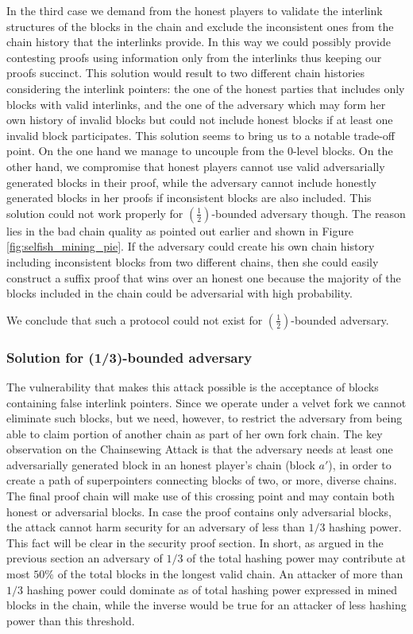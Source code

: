 In the third case we demand from the honest players to validate the interlink structures of the blocks in the chain and exclude the inconsistent ones from the chain history that the interlinks provide. In this way we could possibly provide contesting proofs using information only from the interlinks thus keeping our proofs succinct. This solution would result to two different chain histories considering the interlink pointers: the one of the honest parties that includes only blocks with valid interlinks, and the one of the adversary which may form her own history of invalid blocks but could not include honest blocks if at least one invalid block participates. This solution seems to bring us to a notable trade-off point. On the one hand we manage to uncouple from the 0-level blocks. On the other hand, we compromise that honest players cannot use valid adversarially generated blocks in their proof, while the adversary cannot include honestly generated blocks in her proofs if inconsistent blocks are also included. This solution could not work properly for $(\frac{1}{2})$-bounded adversary though. The reason lies in the bad chain quality as pointed out earlier and shown in Figure \ref{fig:selfish_mining_pie}. If the adversary  could create his own chain history including inconsistent blocks from two different chains, then she could easily construct a suffix proof that wins over an honest one because the majority of the blocks included in the chain could be adversarial with high probability. 

We conclude that such a protocol could not exist for $(\frac{1}{2})$-bounded adversary.


\subsubsection*{Solution for (1/3)-bounded adversary}
The vulnerability that makes this attack possible is the acceptance of blocks containing false interlink pointers. Since we operate under a velvet fork we cannot eliminate such blocks, but we need, however, to restrict the adversary from being able to claim portion of another chain as part of her own fork chain. 
The key observation on the Chainsewing Attack is that the adversary needs at least one adversarially generated block in an honest player's chain (block $a'$), in order to create a path of superpointers connecting blocks of two, or more, diverse chains. The final proof chain will make use of this crossing point and may contain both honest or adversarial blocks. 
In case the proof contains only adversarial blocks, the attack cannot harm security for an adversary of less than $1/3$ hashing power. This fact will be clear in the security proof section. In short, as argued in the previous section an adversary of $1/3$ of the total hashing power may contribute at most $ 50\% $ of the total blocks in the longest valid chain. An attacker of more than $1/3$ hashing power could dominate as of total hashing power expressed in mined blocks in the chain, while the inverse would be true for an attacker of less hashing power than this threshold.

